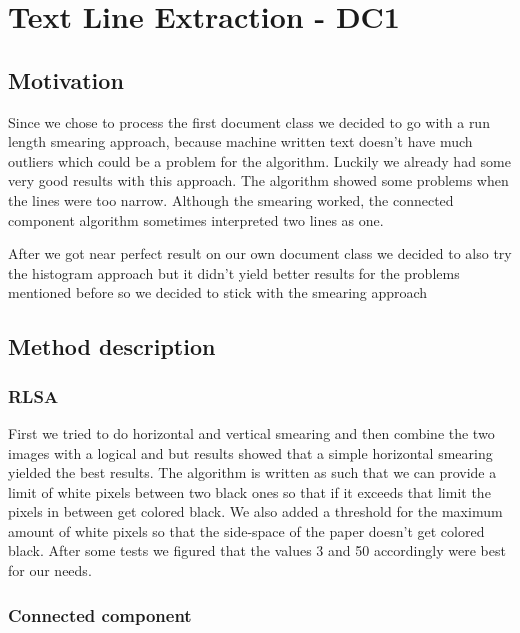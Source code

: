 \documentclass[a4paper, 10pt]{article}
\begin{document}
	\section{Text Line Extraction - DC1}
	
	\subsection{Motivation}
	
	\par{Since we chose to process the first document class we decided to go with a run length smearing approach, because machine written text doesn't have much outliers which could be a problem for the algorithm. Luckily we already had some very good results with this approach. The algorithm showed some problems when the lines were too narrow. Although the smearing worked, the connected component algorithm sometimes interpreted two lines as one.}
	\par{After we got near perfect result on our own document class we decided to also try the histogram approach but it didn't yield better results for the problems mentioned before so we decided to stick with the smearing approach}
	
	\subsection{Method description}
	
	\subsubsection{RLSA}
	
	\par{First we tried to do horizontal and vertical smearing and then combine the two images with a logical and but results showed that a simple horizontal smearing yielded the best results. The algorithm is written as such that we can provide a limit of white pixels between two black ones so that if it exceeds that limit the pixels in between get colored black. We also added a threshold for the maximum amount of white pixels so that the side-space of the paper doesn't get colored black. After some tests we figured that the values 3 and 50 accordingly were best for our needs.}
	
	\subsubsection{Connected component}
	
\end{document}
